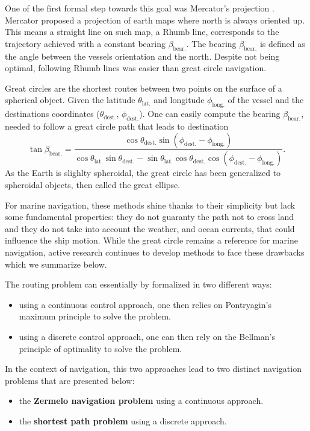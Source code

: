 One of the first formal step towards this goal was Mercator's projection \citep{snyder1997flattening}.
Mercator proposed a projection of earth maps where north is always oriented up.
This means a straight line on such map, a Rhumb line, corresponds to the trajectory achieved with a constant bearing $\beta_{\mathrm{bear.}}$.
The bearing $\beta_{\mathrm{bear.}}$ is defined as the angle between the vessels orientation and the north.
Despite not being optimal, following Rhumb lines was easier than great circle navigation.

Great circles are the shortest routes between two points on the surface of a spherical object.
Given the latitude $\theta_{\mathrm{lat.}}$ and longitude $\phi_{\mathrm{long.}}$ of the vessel and the destinations coordinates ($\theta_{\mathrm{dest.}}$, $\phi_{\mathrm{dest.}}$).
One can easily compute the bearing $\beta_{\mathrm{bear.}}$, needed to follow a great circle path that leads to destination
\begin{equation}
	\tan \beta_{\mathrm{bear.}} = \frac{\cos \theta_{\mathrm{dest.}} \sin \left(\phi_{\mathrm{dest.}} - \phi_{\mathrm{long.}}\right)}{\cos \theta_{\mathrm{lat.}} \sin \theta_{\mathrm{dest.}} - \sin \theta_{\mathrm{lat.}} \cos \theta_{\mathrm{dest.}} \cos \left(\phi_{\mathrm{dest.}} - \phi_{\mathrm{long.}} \right)}.
\end{equation}
As the Earth is slighlty spheroidal, the great circle has been generalized to spheroidal objects, then called the great ellipse.

For marine navigation, these methods shine thanks to their simplicity but lack some fundamental properties: they do not guaranty the path not to cross land and they do not take into account the weather, and ocean currents, that could influence the ship motion.
While the great circle remains a reference for marine navigation, active research continues to develop methods to face these drawbacks which we summarize below.

The routing problem can essentially by formalized in two different ways:
\begin{itemize}
	\item using a continuous control approach, one then relies on Pontryagin's maximum principle to solve the problem.
	\item using a discrete control approach, one can then rely on the Bellman's principle of optimality to solve the problem.
\end{itemize}
In the context of navigation, this two approaches lead to two distinct navigation problems that are presented below:
\begin{itemize}
	\item the \textbf{Zermelo navigation problem} using a continuous approach.
	\item the \textbf{shortest path problem} using a discrete approach.
\end{itemize}

